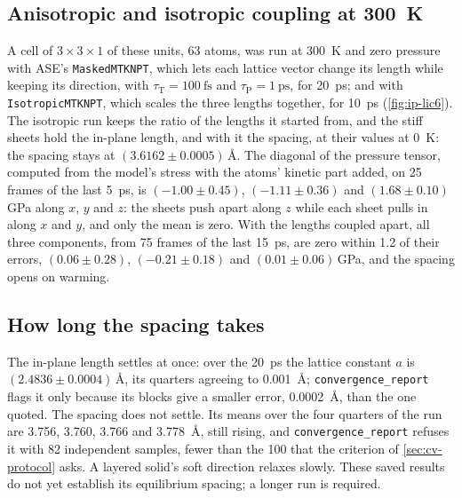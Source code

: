 \subsection*{Anisotropic and isotropic coupling at \SI{300}{\kelvin}}

A cell of $3\times3\times1$ of these units, 63 atoms, was run at
\SI{300}{\kelvin} and zero pressure with ASE's \texttt{MaskedMTKNPT}, which
lets each lattice vector change its length while keeping its direction,
with $\tau_{\mathrm T} = \SI{100}{\femto\second}$ and $\tau_{\mathrm P} =
\SI{1}{\pico\second}$, for \SI{20}{\pico\second}; and with
\texttt{IsotropicMTKNPT}, which scales the three lengths together, for
\SI{10}{\pico\second} (\cref{fig:ip-lic6}). The isotropic run keeps the
ratio of the lengths it started from, and the stiff sheets hold the
in-plane length, and with it the spacing, at their values at
\SI{0}{\kelvin}: the spacing stays at $(3.6162 \pm
0.0005)$\,\si{\angstrom}. The diagonal of the pressure tensor, computed
from the model's stress with the atoms' kinetic part added, on 25 frames
of the last \SI{5}{\pico\second}, is $(-1.00 \pm 0.45)$, $(-1.11 \pm
0.36)$ and $(1.68 \pm 0.10)$\,\si{\giga\pascal} along $x$, $y$ and $z$:
the sheets push apart along $z$ while each sheet pulls in along $x$ and
$y$, and only the mean is zero. With the lengths coupled apart, all
three components, from 75 frames of the last \SI{15}{\pico\second}, are
zero within 1.2 of their errors, $(0.06 \pm 0.28)$, $(-0.21 \pm 0.18)$
and $(0.01 \pm 0.06)$\,\si{\giga\pascal}, and the spacing opens on
warming.

\subsection*{How long the spacing takes}

The in-plane length settles at once: over the \SI{20}{\pico\second} the
lattice constant $a$ is $(2.4836 \pm 0.0004)$\,\si{\angstrom}, its
quarters agreeing to \SI{0.001}{\angstrom}; \texttt{convergence\_report}
flags it only because its blocks give a smaller error,
\SI{0.0002}{\angstrom}, than the one quoted. The spacing does not settle. Its
means over the four quarters of the run are 3.756, 3.760, 3.766 and
\SI{3.778}{\angstrom}, still rising, and \texttt{convergence\_report}
refuses it with 82 independent samples, fewer than the 100 that the
criterion of \cref{sec:cv-protocol} asks. A layered solid's soft
direction relaxes slowly. These saved results do not yet establish its
equilibrium spacing; a longer run is required.

